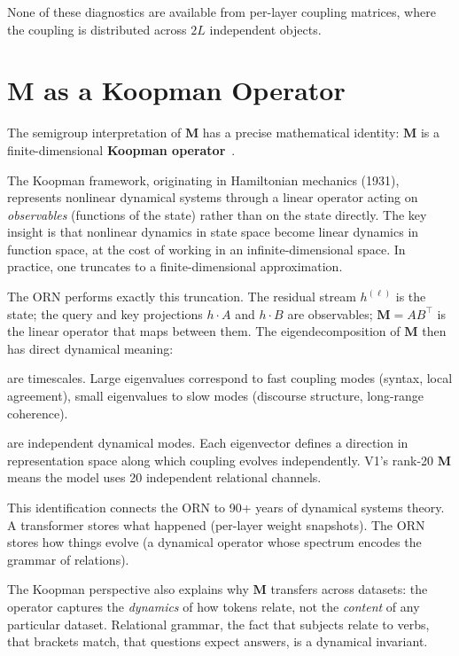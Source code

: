 \documentclass[11pt, a4paper]{article}
\newcommand{\M}{\mathbf{M}}
\theoremstyle{plain}
\theoremstyle{remark}
\begin{document}
None of these diagnostics are available from per-layer coupling matrices, where the coupling is distributed across $2L$ independent objects.

\section{M as a Koopman Operator}

The semigroup interpretation of $\M$ has a precise mathematical identity: $\M$ is a finite-dimensional \textbf{Koopman operator}~\cite{koopman1931hamiltonian}.

The Koopman framework, originating in Hamiltonian mechanics (1931), represents nonlinear dynamical systems through a linear operator acting on \emph{observables} (functions of the state) rather than on the state directly.
The key insight is that nonlinear dynamics in state space become linear dynamics in function space, at the cost of working in an infinite-dimensional space.
In practice, one truncates to a finite-dimensional approximation.

The ORN performs exactly this truncation.
The residual stream $h^{(\ell)}$ is the state; the query and key projections $h \cdot A$ and $h \cdot B$ are observables; $\M = AB^\top$ is the linear operator that maps between them.
The eigendecomposition of $\M$ then has direct dynamical meaning:

\begin{description}[nosep, leftmargin=1.5em]
    \item[Eigenvalues] are timescales.
    Large eigenvalues correspond to fast coupling modes (syntax, local agreement), small eigenvalues to slow modes (discourse structure, long-range coherence).
    \item[Eigenvectors] are independent dynamical modes.
    Each eigenvector defines a direction in representation space along which coupling evolves independently.
    V1's rank-20 $\M$ means the model uses 20 independent relational channels.
\end{description}

This identification connects the ORN to 90+ years of dynamical systems theory.
A transformer stores what happened (per-layer weight snapshots).
The ORN stores how things evolve (a dynamical operator whose spectrum encodes the grammar of relations).

The Koopman perspective also explains why $\M$ transfers across datasets: the operator captures the \emph{dynamics} of how tokens relate, not the \emph{content} of any particular dataset.
Relational grammar, the fact that subjects relate to verbs, that brackets match, that questions expect answers, is a dynamical invariant.
\end{document}
